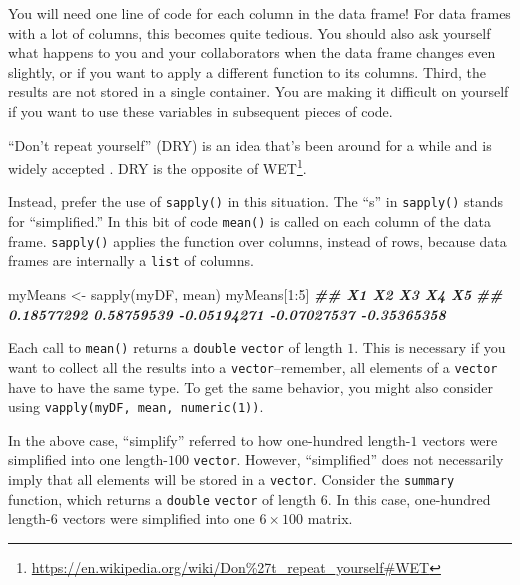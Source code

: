 \documentclass[
  12pt,
  krantz2]{krantz}
\makeatletter
\newenvironment{Shaded}{\begin{snugshade}}{\end{snugshade}}
\newcommand{\DecValTok}[1]{\textcolor[rgb]{0.06,0.06,0.06}{#1}}
\newcommand{\DocumentationTok}[1]{\textcolor[rgb]{0.37,0.37,0.37}{\textbf{\textit{#1}}}}
\newcommand{\FunctionTok}[1]{\textcolor[rgb]{0,0,0}{#1}}
\newcommand{\NormalTok}[1]{#1}
\newcommand{\OtherTok}[1]{\textcolor[rgb]{0.37,0.37,0.37}{#1}}
\newcommand{\SpecialCharTok}[1]{\textcolor[rgb]{0,0,0}{#1}}
\renewcommand{\href}[2]{#2\footnote{\url{#1}}}
\newenvironment{kframe}{%
\medskip{}
\setlength{\fboxsep}{.8em}
 \def\at@end@of@kframe{}%
 \ifinner\ifhmode%
  \def\at@end@of@kframe{\end{minipage}}%
  \begin{minipage}{\columnwidth}%
 \fi\fi%
 \def\FrameCommand##1{\hskip\@totalleftmargin \hskip-\fboxsep
 \colorbox{shadecolor}{##1}\hskip-\fboxsep
     \hskip-\linewidth \hskip-\@totalleftmargin \hskip\columnwidth}%
 \MakeFramed {\advance\hsize-\width
   \@totalleftmargin\z@ \linewidth\hsize
   \@setminipage}}%
 {\par\unskip\endMakeFramed%
 \at@end@of@kframe}
\renewenvironment{Shaded}{\begin{kframe}}{\end{kframe}}
\makeatother
\begin{document}
You will need one line of code for each column in the data frame! For data frames with a lot of columns, this becomes quite tedious. You should also ask yourself what happens to you and your collaborators when the data frame changes even slightly, or if you want to apply a different function to its columns. Third, the results are not stored in a single container. You are making it difficult on yourself if you want to use these variables in subsequent pieces of code.

\begin{rmd-details}
``Don't repeat yourself'' (DRY) is an idea that's been around for a while and is widely accepted \citep{hunt2000pragmatic}. DRY is the opposite of \href{https://en.wikipedia.org/wiki/Don\%27t_repeat_yourself\#WET}{WET}.

\end{rmd-details}

Instead, prefer the use of \texttt{sapply()} in this situation. The ``s'' in \texttt{sapply()} stands for ``simplified.'' In this bit of code \texttt{mean()} is called on each column of the data frame. \texttt{sapply()} applies the function over columns, instead of rows, because data frames are internally a \texttt{list} of columns.

\begin{Shaded}
\begin{Highlighting}[]
\NormalTok{myMeans }\OtherTok{\textless{}{-}} \FunctionTok{sapply}\NormalTok{(myDF, mean)}
\NormalTok{myMeans[}\DecValTok{1}\SpecialCharTok{:}\DecValTok{5}\NormalTok{]}
\DocumentationTok{\#\#          X1          X2          X3          X4          X5 }
\DocumentationTok{\#\#  0.18577292  0.58759539 {-}0.05194271 {-}0.07027537 {-}0.35365358}
\end{Highlighting}
\end{Shaded}

Each call to \texttt{mean()} returns a \texttt{double} \texttt{vector} of length \(1\). This is necessary if you want to collect all the results into a \texttt{vector}--remember, all elements of a \texttt{vector} have to have the same type. To get the same behavior, you might also consider using \texttt{vapply(myDF,\ mean,\ numeric(1))}.

In the above case, ``simplify'' referred to how one-hundred length-\(1\) vectors were simplified into one length-\(100\) \texttt{vector}. However, ``simplified'' does not necessarily imply that all elements will be stored in a \texttt{vector}. Consider the \texttt{summary} function, which returns a \texttt{double} \texttt{vector} of length \(6\). In this case, one-hundred length-\(6\) vectors were simplified into one \(6 \times 100\) matrix.
\end{document}
